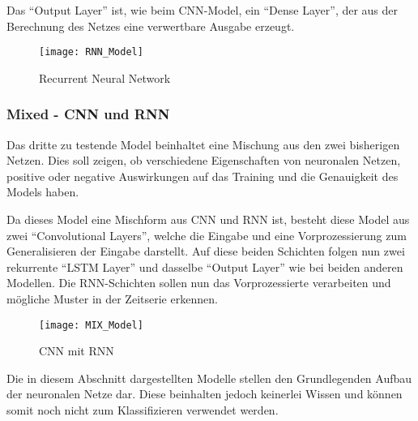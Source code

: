    \noindent
    Das "`Output Layer"' ist, wie beim \ac{CNN}-Model, ein "`Dense Layer"', der aus der Berechnung des Netzes eine verwertbare Ausgabe erzeugt.

    \begin{figure}[H]
        \centering
        \texttt{[image: RNN\_Model]}
        \caption{Recurrent Neural Network}
        \label{fig:RNN_MODEL}
    \end{figure}

    \subsubsection{Mixed - CNN und RNN}
    Das dritte zu testende Model beinhaltet eine Mischung aus den zwei bisherigen Netzen. 
    Dies soll zeigen, ob verschiedene Eigenschaften von neuronalen Netzen, positive oder negative Auswirkungen auf das Training und die Genauigkeit des Models haben.
    \newline

    \noindent
    Da dieses Model eine Mischform aus \ac{CNN} und \ac{RNN} ist, besteht diese Model aus zwei "`Convolutional Layers"', welche die Eingabe und eine Vorprozessierung zum Generalisieren der Eingabe darstellt.
    Auf diese beiden Schichten folgen nun zwei rekurrente "`LSTM Layer"' und dasselbe "`Output Layer"' wie bei beiden anderen Modellen.
    Die \ac{RNN}-Schichten sollen nun das Vorprozessierte verarbeiten und mögliche Muster in der Zeitserie erkennen.     

    \begin{figure}[H]
        \centering
        \texttt{[image: MIX\_Model]}
        \caption{\ac{CNN} mit \ac{RNN}}
        \label{fig:MIX_MODEL}
    \end{figure}

    Die in diesem Abschnitt dargestellten Modelle stellen den Grundlegenden Aufbau der neuronalen Netze dar.
    Diese beinhalten jedoch keinerlei Wissen und können somit noch nicht zum Klassifizieren verwendet werden.    


